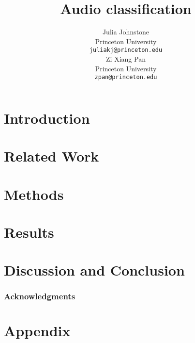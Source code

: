 \documentclass{article} %
\title{Audio classification}
\author{
Julia Johnstone\\
Princeton University\\
\texttt{juliakj@princeton.edu} \\
\And
Zi Xiang Pan \\
Princeton University \\
\texttt{zpan@princeton.edu} \\
}
\begin{document}
\maketitle

\begin{abstract}

\end{abstract}

\section{Introduction}



\section{Related Work}



\section{Methods}



\section{Results}



\section{Discussion and Conclusion}



\subsubsection*{Acknowledgments}






\section{Appendix}\label{section:appendix}
\end{document}
